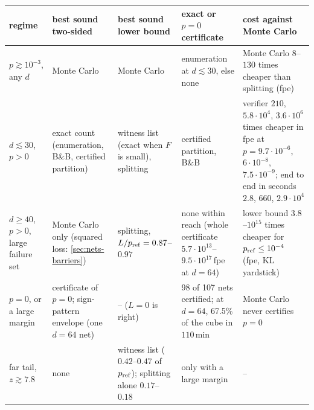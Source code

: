 \begin{tabular}{p{2.1cm}p{2.8cm}p{3.0cm}p{3.5cm}p{3.1cm}}
\toprule
{\raggedright regime\par} & {\raggedright best sound two-sided\par} & {\raggedright best sound lower bound\par} & {\raggedright exact or $p=0$ certificate\par} & {\raggedright cost against Monte Carlo\par}\\
\midrule
{\raggedright $p\gtrsim10^{-3}$, any $d$\par} & {\raggedright Monte Carlo\par} & {\raggedright Monte Carlo\par} & {\raggedright enumeration at $d\lesssim30$, else none\par} & {\raggedright Monte Carlo $8$--$130$ times cheaper than splitting (fpe)\par}\\
{\raggedright $d\lesssim30$, $p>0$\par} & {\raggedright exact count (enumeration, B\&B, certified partition)\par} & {\raggedright witness list (exact when $F$ is small), splitting\par} & {\raggedright certified partition, B\&B\par} & {\raggedright verifier $210$, $5.8\cdot10^{4}$, $3.6\cdot10^{6}$ times cheaper in fpe at $p=9.7\cdot10^{-6}$, $6\cdot10^{-8}$, $7.5\cdot10^{-9}$; end to end in seconds $2.8$, $660$, $2.9\cdot10^{4}$\par}\\
{\raggedright $d\geq40$, $p>0$, large failure set\par} & {\raggedright Monte Carlo only (squared loss: \cref{sec:nets-barriers})\par} & {\raggedright splitting, $L/p_{\rm ref}=0.87$--$0.97$\par} & {\raggedright none within reach (whole certificate $5.7\cdot10^{13}$--$9.5\cdot10^{17}$\,fpe at $d=64$)\par} & {\raggedright lower bound $3.8$--$10^{15}$ times cheaper for $p_{\rm ref}\leq10^{-4}$ (fpe, KL yardstick)\par}\\
{\raggedright $p=0$, or a large margin\par} & {\raggedright certificate of $p=0$; sign-pattern envelope (one $d=64$ net)\par} & {\raggedright -- ($L=0$ is right)\par} & {\raggedright 98 of 107 nets certified; at $d=64$, 67.5\% of the cube in $110$\,min\par} & {\raggedright Monte Carlo never certifies $p=0$\par}\\
{\raggedright far tail, $z\gtrsim7.8$\par} & {\raggedright none\par} & {\raggedright witness list ($0.42$--$0.47$ of $p_{\rm ref}$); splitting alone $0.17$--$0.18$\par} & {\raggedright only with a large margin\par} & {\raggedright --\par}\\
\bottomrule
\end{tabular}
